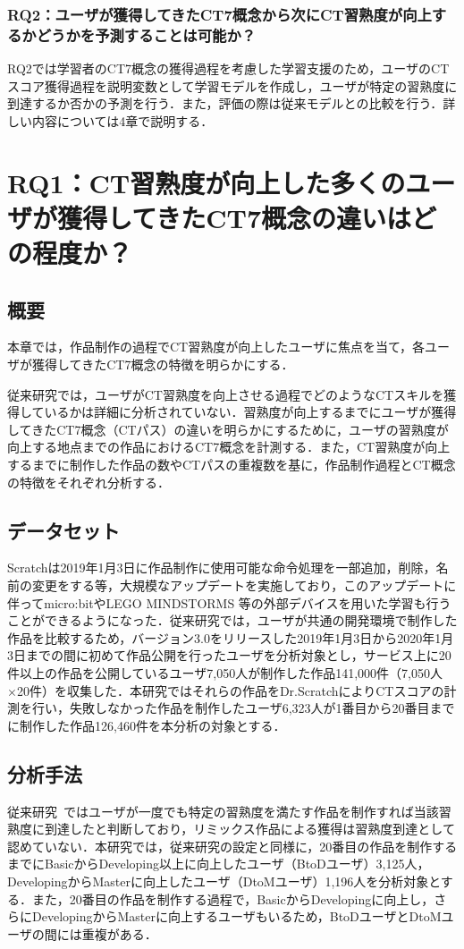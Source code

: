 \documentclass[11pt,dvipdfmx]{jreport}
\begin{document}
\subsection{RQ2：ユーザが獲得してきたCT7概念から次にCT習熟度が向上するかどうかを予測することは可能か？}

RQ2では学習者のCT7概念の獲得過程を考慮した学習支援のため，ユーザのCTスコア獲得過程を説明変数として学習モデルを作成し，ユーザが特定の習熟度に到達するか否かの予測を行う．また，評価の際は従来モデルとの比較を行う．詳しい内容については4章で説明する．


\chapter{RQ1：CT習熟度が向上した多くのユーザが獲得してきたCT7概念の違いはどの程度か？}\label{sec:chapter_3}
\section{概要}
本章では，作品制作の過程でCT習熟度が向上したユーザに焦点を当て，各ユーザが獲得してきたCT7概念の特徴を明らかにする．

従来研究では，ユーザがCT習熟度を向上させる過程でどのようなCTスキルを獲得しているかは詳細に分析されていない．習熟度が向上するまでにユーザが獲得してきたCT7概念（CTパス）の違いを明らかにするために，ユーザの習熟度が向上する地点までの作品におけるCT7概念を計測する．また，CT習熟度が向上するまでに制作した作品の数やCTパスの重複数を基に，作品制作過程とCT概念の特徴をそれぞれ分析する．


\section{データセット}\label{sec:chapter_3-1}
Scratchは2019年1月3日に作品制作に使用可能な命令処理を一部追加，削除，名前の変更をする等，大規模なアップデートを実施しており，このアップデートに伴ってmicro:bitやLEGO MINDSTORMS 等の外部デバイスを用いた学習も行うことができるようになった．従来研究では，ユーザが共通の開発環境で制作した作品を比較するため，バージョン3.0をリリースした2019年1月3日から2020年1月3日までの間に初めて作品公開を行ったユーザを分析対象とし，サービス上に20件以上の作品を公開しているユーザ7,050人が制作した作品141,000件（7,050人×20件）を収集した．本研究ではそれらの作品をDr.ScratchによりCTスコアの計測を行い，失敗しなかった作品を制作したユーザ6,323人が1番目から20番目までに制作した作品126,460件を本分析の対象とする．


\section{分析手法}\label{sec:chapter_3-2}
従来研究~\cite{Ando_2021}ではユーザが一度でも特定の習熟度を満たす作品を制作すれば当該習熟度に到達したと判断しており，リミックス作品による獲得は習熟度到達として認めていない．本研究では，従来研究の設定と同様に，20番目の作品を制作するまでにBasicからDeveloping以上に向上したユーザ（BtoDユーザ）3,125人，DevelopingからMasterに向上したユーザ（DtoMユーザ）1,196人を分析対象とする．また，20番目の作品を制作する過程で，BasicからDevelopingに向上し，さらにDevelopingからMasterに向上するユーザもいるため，BtoDユーザとDtoMユーザの間には重複がある．
\end{document}
